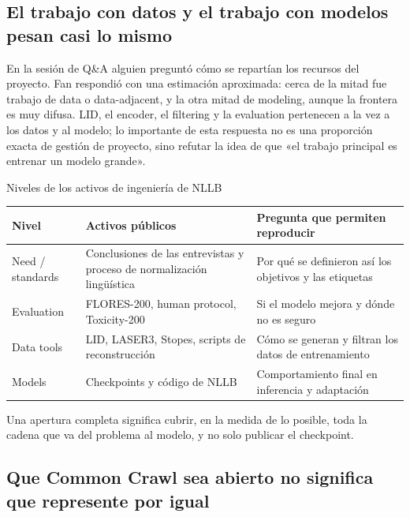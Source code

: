\subsection{El trabajo con datos y el trabajo con modelos pesan casi lo mismo}

En la sesión de Q\&A alguien preguntó cómo se repartían los recursos del proyecto. Fan respondió con una estimación aproximada: cerca de la mitad fue trabajo de data o data-adjacent, y la otra mitad de modeling, aunque la frontera es muy difusa. LID, el encoder, el filtering y la evaluation pertenecen a la vez a los datos y al modelo; lo importante de esta respuesta no es una proporción exacta de gestión de proyecto, sino refutar la idea de que «el trabajo principal es entrenar un modelo grande».

\begin{importantbox}{Niveles de los activos de ingeniería de NLLB}
\begin{tabularx}{\textwidth}{@{}L{0.2\textwidth}L{0.29\textwidth}X@{}}
\toprule
Nivel & Activos públicos & Pregunta que permiten reproducir \\
\midrule
Need / standards & Conclusiones de las entrevistas y proceso de normalización lingüística & Por qué se definieron así los objetivos y las etiquetas \\
Evaluation & FLORES-200, human protocol, Toxicity-200 & Si el modelo mejora y dónde no es seguro \\
Data tools & LID, LASER3, Stopes, scripts de reconstrucción & Cómo se generan y filtran los datos de entrenamiento \\
Models & Checkpoints y código de NLLB & Comportamiento final en inferencia y adaptación \\
\bottomrule
\end{tabularx}
Una apertura completa significa cubrir, en la medida de lo posible, toda la cadena que va del problema al modelo, y no solo publicar el checkpoint.
\end{importantbox}


\subsection{Que Common Crawl sea abierto no significa que represente por igual}


